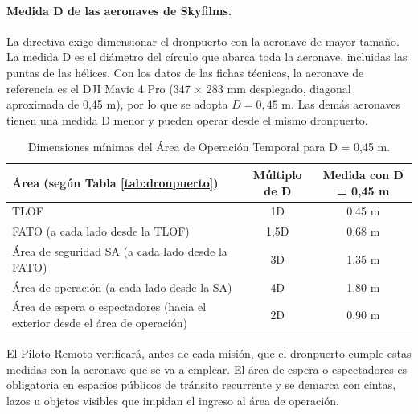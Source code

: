 \paragraph{Medida D de las aeronaves de Skyfilms.}
La directiva exige dimensionar el dronpuerto con la aeronave de mayor tamaño. La medida D es el diámetro del círculo que abarca toda la aeronave, incluidas las puntas de las hélices. Con los datos de las fichas técnicas, la aeronave de referencia es el DJI Mavic 4 Pro (347 × 283 mm desplegado, diagonal aproximada de 0,45 m), por lo que se adopta $D = 0{,}45$ m. Las demás aeronaves tienen una medida D menor y pueden operar desde el mismo dronpuerto.

\begin{table}[H]
\centering
\renewcommand{\arraystretch}{1.3}
\begin{tabularx}{\textwidth}{|X|c|c|}
\hline
\textbf{Área (según Tabla \ref{tab:dronpuerto})} & \textbf{Múltiplo de D} & \textbf{Medida con D = 0,45 m} \\ \hline
TLOF & 1D & 0,45 m \\ \hline
FATO (a cada lado desde la TLOF) & 1,5D & 0,68 m \\ \hline
Área de seguridad SA (a cada lado desde la FATO) & 3D & 1,35 m \\ \hline
Área de operación (a cada lado desde la SA) & 4D & 1,80 m \\ \hline
Área de espera o espectadores (hacia el exterior desde el área de operación) & 2D & 0,90 m \\ \hline
\end{tabularx}
\caption{Dimensiones mínimas del Área de Operación Temporal para D = 0,45 m.}
\end{table}

El Piloto Remoto verificará, antes de cada misión, que el dronpuerto cumple estas medidas con la aeronave que se va a emplear. El área de espera o espectadores es obligatoria en espacios públicos de tránsito recurrente y se demarca con cintas, lazos u objetos visibles que impidan el ingreso al área de operación.

